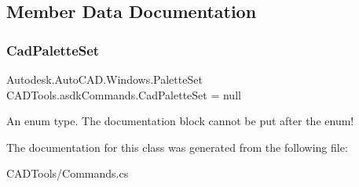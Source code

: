 \subsection{Member Data Documentation}
\mbox{\label{class_c_a_d_tools_1_1asdk_commands_adb7b7f118a05b939e18f040e3b679d22}} 
\subsubsection{\texorpdfstring{Cad\+Palette\+Set}{CadPaletteSet}}
{\footnotesize\ttfamily Autodesk.\+Auto\+C\+A\+D.\+Windows.\+Palette\+Set C\+A\+D\+Tools.\+asdk\+Commands.\+Cad\+Palette\+Set = null\hspace{0.3cm}{\ttfamily [static]}}

An enum type. The documentation block cannot be put after the enum! 

The documentation for this class was generated from the following file\+:\begin{DoxyCompactItemize}
\item 
C\+A\+D\+Tools/Commands.\+cs\end{DoxyCompactItemize}
